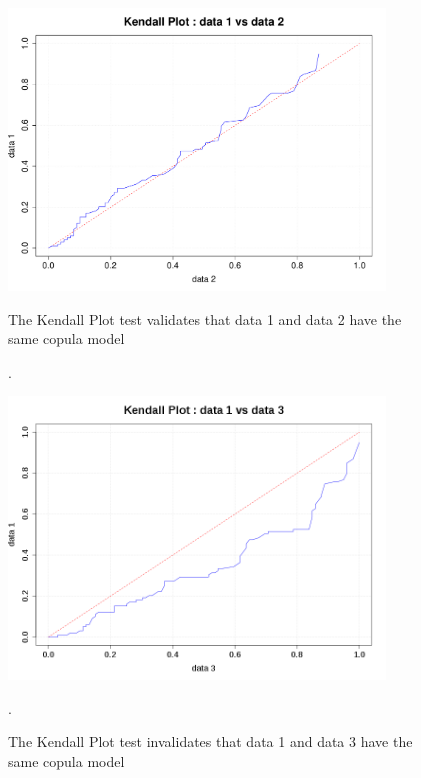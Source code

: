              \begin{figure}[H]
               \begin{minipage}{10cm}
                 \begin{center}
                   \includegraphics[width=10cm]{Figures/KendallPlotSample.pdf}
                 \end{center}
                 \caption{The Kendall Plot test validates that data 1 and data 2 have the same copula model}.
                 \label{SameCop}
               \end{minipage}
               \hfill
               \begin{minipage}{10cm}
                 \begin{center}
                   \includegraphics[width=10cm]{Figures/KendallPlotSampleBad.png}
                 \end{center}
                 \caption{The Kendall Plot test invalidates that data 1 and data 3 have the same copula model}.
                 \label{DifCop}
               \end{minipage}
             \end{figure}
